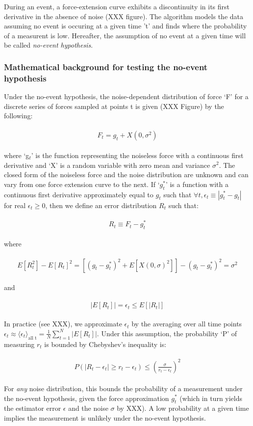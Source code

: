 \documentclass[%
  aip,12pt,tightenlines,
  amsthm,
 amsmath,amssymb
]{article}
\newcommand{\eqs}[1]{
\begin{align*} 
\begin{split}
#1
\end{split}					
\end{align*}}
\newcommand{\firstp}[0]{}
\newcommand{\pl}[0]{\vspace{6pt}}
\begin{document}
\firstp During an event, a force-extension curve exhibits a discontinuity in its first derivative in the absence of noise (XXX figure). The algorithm models the data assuming no event is occuring at a given time 't' and finds where the probability of a measurent is low. Hereafter, the assumption of no event at a given time will be called \emph{no-event hypothesis}. 

\subsubsection{Mathematical background for testing the no-event hypothesis}

\firstp Under the no-event hypothesis, the noise-dependent distribution of force `F' for a discrete series of forces sampled at points t is given (XXX Figure) by the following:

\eqs{ F_t = g_t + X(0,\sigma^2) }

where `g$_t$' is the function representing the noiseless force with a continuous first derivative and `X' is a random variable with zero mean and variance $\sigma^2$. The closed form of the noiseless force and the noise distribution are unknown and can vary from one force extension curve to the next. If `$g^{*}_t$' is a function with a continuous first derivative approximately equal to $g_t$ such that $\forall t,\epsilon_t\equiv|g^{*}_t-g_t|$ for real $\epsilon_t\ge 0$, then we define an error distribution $R_t$ such that: \pl

\eqs{ R_t \equiv F_t - g^{*}_t }

where

\eqs{ E[R_t^2] -E[R_t]^2 = [(g_t-g^{*}_t)^2 + E[X(0,\sigma)^2]] - (g_t-g^{*}_t)^2  = \sigma^2 }

and 

\eqs{ |E[R_t]| = \epsilon_t \le E[|R_t|] }

In practice (see XXX), we approximate $\epsilon_t$ by the averaging over all time points $\epsilon_t \approx \langle \epsilon_t \rangle_{\text{all t}} = \frac{1}{N} \sum_{t=1}^N |E[R_t]|$. Under this assumption, the probability `P' of measuring $r_t$ is bounded by Chebyshev's inequality is:

\eqs{ P( |R_t-\epsilon_t| \ge r_t-\epsilon_t ) \le
 (\frac{\sigma}{r_t-\epsilon_t})^2 }


For \emph{any} noise distribution, this bounds the probability of a measurement under the no-event hypothesis, given the force approximation $g^{*}_t$ (which in turn yields the estimator error $\epsilon$ and the noise $\sigma$ by XXX). A low probability at a given time implies the measurement is unlikely under the no-event hypothesis. \pl
\end{document}
